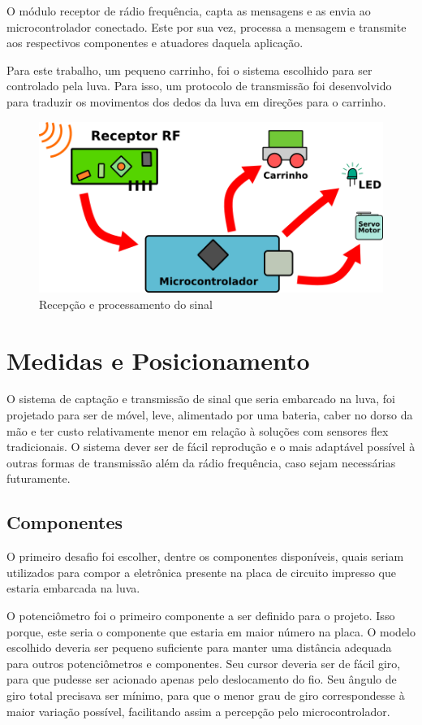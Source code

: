 \documentclass{ufpatcc}
\begin{document}
			O módulo receptor de rádio frequência, capta as mensagens e as envia ao microcontrolador conectado. Este por sua vez, processa a mensagem e transmite aos respectivos componentes e atuadores daquela aplicação.

			Para este trabalho, um pequeno carrinho, foi o sistema escolhido para ser controlado pela luva. Para isso, um protocolo de transmissão foi desenvolvido para traduzir os movimentos dos dedos da luva em direções para o carrinho.
	
		\begin{figure}[h!]
  		\label{fig:receptor-to-app1}
			\centering
  		\includegraphics[scale=0.8]{../pictures/receptor-to-app1.png}
			\caption{Recepção e processamento do sinal}
		\end{figure}


		\section{Medidas e Posicionamento}	

			O sistema de captação e transmissão de sinal que seria embarcado na luva, foi projetado para ser de móvel, leve, alimentado por uma bateria, caber no dorso da mão e ter custo relativamente menor em relação à soluções com sensores flex tradicionais. O sistema dever ser de fácil reprodução e o mais adaptável possível à outras formas de transmissão além da rádio frequência, caso sejam necessárias futuramente.

			\subsection{Componentes}

			O primeiro desafio foi escolher, dentre os componentes disponíveis, quais seriam utilizados para compor a eletrônica presente na placa de circuito impresso que estaria embarcada na luva.

			O potenciômetro foi o primeiro componente a ser definido para o projeto. Isso porque, este seria o componente que estaria em maior número na placa. O modelo escolhido deveria ser pequeno suficiente para manter uma distância adequada para outros potenciômetros e componentes. Seu cursor deveria ser de fácil giro, para que pudesse ser acionado apenas pelo deslocamento do fio. Seu ângulo de giro total precisava ser mínimo, para que o menor grau de giro correspondesse à maior variação possível, facilitando assim a percepção pelo microcontrolador.
\end{document}
